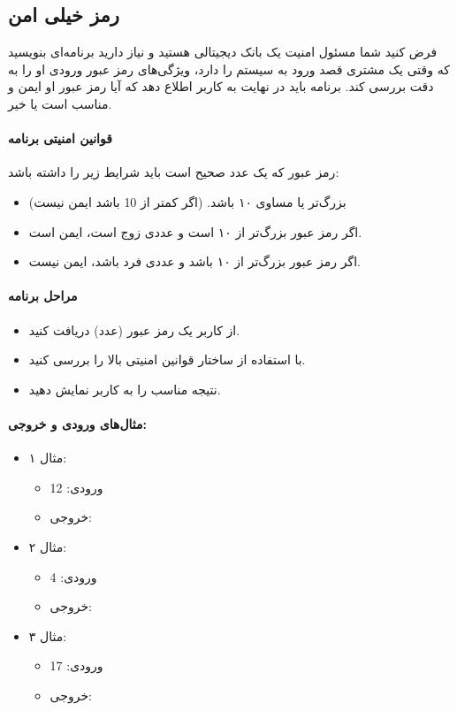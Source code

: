 \documentclass{article}
\begin{document}
\newpage

\subsection{رمز خیلی امن}
فرض کنید شما مسئول امنیت یک بانک دیجیتالی هستید و نیاز دارید برنامه‌ای بنویسید که وقتی یک مشتری قصد ورود به سیستم را دارد، ویژگی‌های رمز عبور ورودی او را به دقت بررسی کند. برنامه باید در نهایت به کاربر اطلاع دهد که آیا رمز عبور او ایمن و مناسب است یا خیر.

\paragraph{قوانین امنیتی برنامه}
رمز عبور که یک عدد صحیح است باید شرایط زیر را داشته باشد:
\begin{itemize}
    \item بزرگ‌تر یا مساوی ۱۰ باشد. (اگر کمتر از 10 باشد ایمن نیست)
    \item اگر رمز عبور بزرگ‌تر از ۱۰ است و عددی زوج است، ایمن است.
    \item اگر رمز عبور بزرگ‌تر از ۱۰ باشد و عددی فرد باشد، ایمن نیست.
\end{itemize}

\paragraph{مراحل برنامه}
\begin{itemize}
    \item از کاربر یک رمز عبور (عدد) دریافت کنید.
    \item با استفاده از ساختار  قوانین امنیتی بالا را بررسی کنید.
    \item نتیجه مناسب را به کاربر نمایش دهید.
\end{itemize}

\paragraph{مثال‌های ورودی و خروجی:}
\begin{itemize}
    \item مثال ۱:
    \begin{itemize}
        \item ورودی: 12
        \item خروجی: 
    \end{itemize}
    \item مثال ۲:
    \begin{itemize}
        \item ورودی: 4
        \item خروجی: 
    \end{itemize}
    \item مثال ۳:
    \begin{itemize}
        \item ورودی: 17
        \item خروجی: 
    \end{itemize}
\end{itemize}
\end{document}

